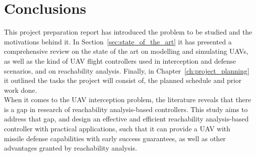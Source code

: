 
%

\chapter{Conclusions}
\label{ch:conclusions}

This project preparation report has introduced the problem to be studied and the motivations behind it. In Section~\ref{sec:state_of_the_art} it has presented a comprehensive review on the state of the art on modelling and simulating UAVs, as well as the kind of UAV flight controllers used in interception and defense scenarios, and on reachability analysis. Finally, in Chapter~\ref{ch:project_planning} it outlined the tasks the project will consist of, the planned schedule and prior work done. \\

When it comes to the UAV interception problem, the literature reveals that there is a gap in research of reachability analysis-based controllers. This study aims to address that gap, and design an effective and efficient reachability analysis-based controller with practical applications, such that it can provide a UAV with missile defense capabilities with early success guarantees, as well as other advantages granted by reachability analysis.
